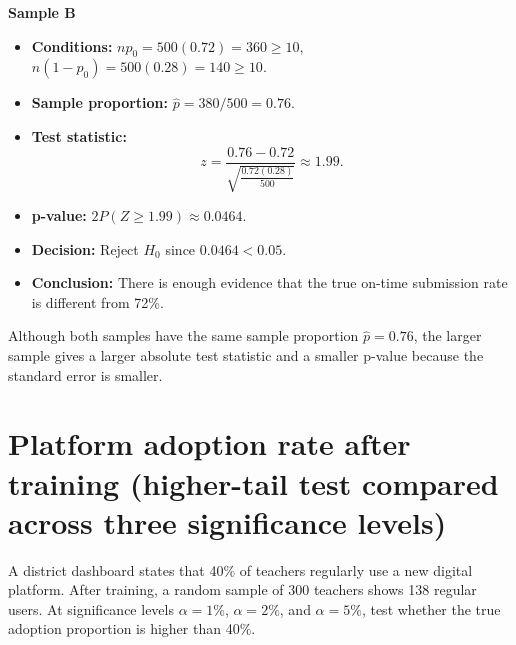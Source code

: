 \begin{center}
\end{center}


\textbf{Sample B}

\begin{itemize}
	\item \textbf{Conditions:} \(np_0=500(0.72)=360\ge10\), \(n(1-p_0)=500(0.28)=140\ge10\).
	\item \textbf{Sample proportion:} \(\hat p=380/500=0.76\).
	\item \textbf{Test statistic:}
	\[
	z=\frac{0.76-0.72}{\sqrt{\frac{0.72(0.28)}{500}}}\approx 1.99.
	\]
	\item \textbf{p-value:} \(2P(Z\ge 1.99)\approx 0.0464\).
	\item \textbf{Decision:} Reject \(H_0\) since \(0.0464<0.05\).
	\item \textbf{Conclusion:} There is enough evidence that the true on-time submission rate is different from 72\%.
\end{itemize}

\begin{center}
\end{center}


Although both samples have the same sample proportion \(\hat p=0.76\), the larger sample gives a larger absolute test statistic and a smaller p-value because the standard error is smaller.

\section{Platform adoption rate after training (higher-tail test compared across three significance levels)}
A district dashboard states that 40\% of teachers regularly use a new digital platform. After training, a random sample of 300 teachers shows 138 regular users. At significance levels \(\alpha=1\%\), \(\alpha=2\%\), and \(\alpha=5\%\), test whether the true adoption proportion is higher than 40\%.

